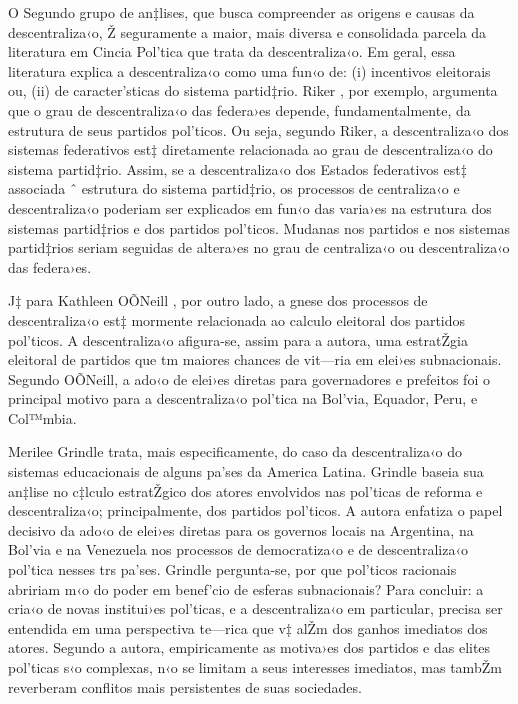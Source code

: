 \documentclass[a4paper, 12pt]{article}
\begin{document}
O Segundo grupo de an‡lises, que busca compreender as origens e causas da descentraliza‹o, Ž seguramente a maior, mais diversa e consolidada parcela da literatura em Cincia Pol’tica que trata da descentraliza‹o. Em geral, essa literatura explica a descentraliza‹o como uma fun‹o de: (i) incentivos eleitorais ou, (ii) de caracter’sticas do sistema partid‡rio. Riker \citeyear{riker_federalism:_1964}, por exemplo, argumenta que o grau de descentraliza‹o das federa›es depende, fundamentalmente, da estrutura de seus partidos pol’ticos. Ou seja, segundo Riker, a descentraliza‹o dos sistemas federativos est‡ diretamente relacionada ao grau de descentraliza‹o do sistema partid‡rio. Assim, se a descentraliza‹o dos Estados federativos est‡ associada ˆ estrutura do sistema partid‡rio, os processos de centraliza‹o e descentraliza‹o poderiam ser explicados em fun‹o das varia›es na estrutura dos sistemas partid‡rios e dos partidos pol’ticos. Mudanas nos partidos e nos sistemas partid‡rios seriam seguidas de altera›es no grau de centraliza‹o ou descentraliza‹o das federa›es.

J‡ para Kathleen OÕNeill \citeyear{oneill_decentralization_2003}, por outro lado, a gnese dos processos de descentraliza‹o est‡ mormente relacionada ao calculo eleitoral dos partidos pol’ticos. A descentraliza‹o afigura-se, assim para a autora, uma estratŽgia eleitoral de partidos que tm maiores chances de vit—ria em elei›es subnacionais. Segundo OÕNeill, a ado‹o de elei›es diretas para governadores e prefeitos foi o principal motivo para a descentraliza‹o pol’tica na Bol’via, Equador, Peru, e Col™mbia.

Merilee Grindle \citeyear{grindle_despite_2004} trata, mais especificamente, do caso da descentraliza‹o do sistemas educacionais de alguns pa’ses da America Latina. Grindle baseia sua an‡lise no c‡lculo estratŽgico dos atores envolvidos nas pol’ticas de reforma e descentraliza‹o; principalmente, dos partidos pol’ticos. A autora enfatiza o papel decisivo da ado‹o de elei›es diretas para os governos locais na Argentina, na Bol’via e na Venezuela nos processos de democratiza‹o e de descentraliza‹o pol’tica nesses trs pa’ses. Grindle pergunta-se, por que pol’ticos racionais abririam m‹o do poder em benef’cio de esferas subnacionais? Para concluir: a cria‹o de novas institui›es pol’ticas, e a descentraliza‹o em particular, precisa ser entendida em uma perspectiva te—rica que v‡ alŽm dos ganhos imediatos dos atores. Segundo a autora, empiricamente as motiva›es dos partidos e das elites pol’ticas s‹o complexas, n‹o se limitam a seus interesses imediatos, mas tambŽm reverberam conflitos mais persistentes de suas sociedades.
\end{document}
